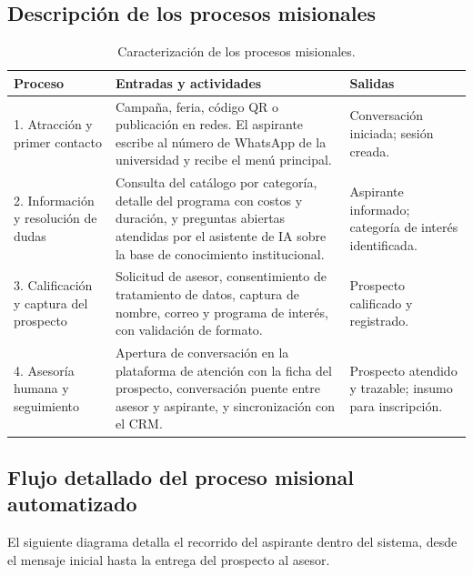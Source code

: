 \documentclass[12pt,a4paper]{report}
\newcommand{\tablacompacta}{\setstretch{1.1}\small}
\newcommand{\cabecera}[1]{\rowcolor{filacabecera}#1}
\begin{document}
\subsection{Descripción de los procesos misionales}

\begin{table}[H]
    \centering
    \tablacompacta
    \begin{tabularx}{\textwidth}{p{2.6cm}XX}
        \toprule
        \cabecera{\textbf{Proceso}} & \textbf{Entradas y actividades} & \textbf{Salidas} \\
        \midrule
        1. Atracción y primer contacto &
        Campaña, feria, código QR o publicación en redes. El aspirante escribe al número de WhatsApp
        de la universidad y recibe el menú principal. &
        Conversación iniciada; sesión creada. \\[0.2cm]
        2. Información y resolución de dudas &
        Consulta del catálogo por categoría, detalle del programa con costos y duración, y preguntas
        abiertas atendidas por el asistente de IA sobre la base de conocimiento institucional. &
        Aspirante informado; categoría de interés identificada. \\[0.2cm]
        3. Calificación y captura del prospecto &
        Solicitud de asesor, consentimiento de tratamiento de datos, captura de nombre, correo y
        programa de interés, con validación de formato. &
        Prospecto calificado y registrado. \\[0.2cm]
        4. Asesoría humana y seguimiento &
        Apertura de conversación en la plataforma de atención con la ficha del prospecto,
        conversación puente entre asesor y aspirante, y sincronización con el CRM. &
        Prospecto atendido y trazable; insumo para inscripción. \\
        \bottomrule
    \end{tabularx}
    \caption{Caracterización de los procesos misionales.}
\end{table}

\subsection{Flujo detallado del proceso misional automatizado}

El siguiente diagrama detalla el recorrido del aspirante dentro del sistema, desde el mensaje
inicial hasta la entrega del prospecto al asesor.
\end{document}
